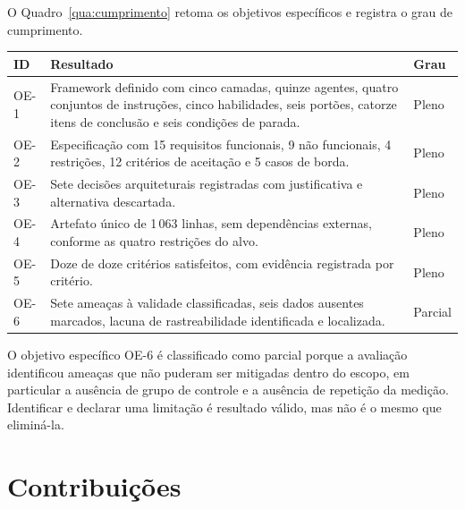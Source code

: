 O Quadro~\ref{qua:cumprimento} retoma os objetivos específicos e registra o grau
de cumprimento.

\begin{quadro}[htb]
	\caption{Grau de cumprimento dos objetivos específicos}
	\label{qua:cumprimento}
	\centering
	\footnotesize
	\begin{tabularx}{\textwidth}{@{}p{1.1cm} X p{1.9cm}@{}}
		\toprule
		\textbf{ID} & \textbf{Resultado} & \textbf{Grau} \\
		\midrule
		OE-1 & Framework definido com cinco camadas, quinze agentes, quatro conjuntos de instruções, cinco habilidades, seis portões, catorze itens de conclusão e seis condições de parada. & Pleno \\
		\addlinespace
		OE-2 & Especificação com 15 requisitos funcionais, 9 não funcionais, 4 restrições, 12 critérios de aceitação e 5 casos de borda. & Pleno \\
		\addlinespace
		OE-3 & Sete decisões arquiteturais registradas com justificativa e alternativa descartada. & Pleno \\
		\addlinespace
		OE-4 & Artefato único de 1\,063 linhas, sem dependências externas, conforme as quatro restrições do alvo. & Pleno \\
		\addlinespace
		OE-5 & Doze de doze critérios satisfeitos, com evidência registrada por critério. & Pleno \\
		\addlinespace
		OE-6 & Sete ameaças à validade classificadas, seis dados ausentes marcados, lacuna de rastreabilidade identificada e localizada. & Parcial \\
		\bottomrule
	\end{tabularx}
\end{quadro}

O objetivo específico OE-6 é classificado como parcial porque a avaliação
identificou ameaças que não puderam ser mitigadas dentro do escopo, em particular
a ausência de grupo de controle e a ausência de repetição da medição. Identificar
e declarar uma limitação é resultado válido, mas não é o mesmo que eliminá-la.

\section{Contribuições}
\label{sec:conc-contribuicoes}

